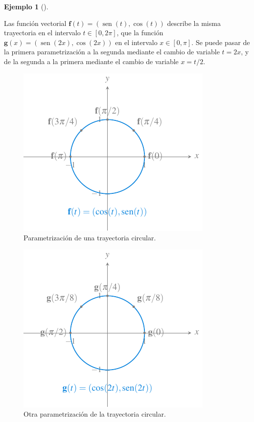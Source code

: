 \documentclass[
  a4paper,
]{scrreport}
\theoremstyle{definition}
\theoremstyle{plain}
\theoremstyle{plain}
\theoremstyle{definition}
\theoremstyle{definition}
\newtheorem{example}{Ejemplo}[chapter]
\theoremstyle{plain}
\theoremstyle{remark}
\begin{document}
\begin{example}[]\protect\hypertarget{exm-parametrizacion-trayectorias}{}\label{exm-parametrizacion-trayectorias}

Las función vectorial \(\mathbf{f}(t)=(\operatorname{sen}(t),\cos(t))\)
describe la misma trayectoria en el intervalo \(t\in[0,2\pi]\), que la
función \(\mathbf{g}(x) = (\operatorname{sen}(2x), \cos(2x))\) en el
intervalo \(x\in[0,\pi]\). Se puede pasar de la primera parametrización
a la segunda mediante el cambio de variable \(t=2x\), y de la segunda a
la primera mediante el cambio de variable \(x=t/2\).

\begin{figure}

{\centering \includegraphics{img/funciones-vectoriales/parametrizacion-trayectoria-circular.pdf}

}

\caption{Parametrización de una trayectoria circular.}

\end{figure}

\begin{figure}

{\centering \includegraphics{img/funciones-vectoriales/parametrizacion-trayectoria-circular-2.pdf}

}

\caption{Otra parametrización de la trayectoria circular.}

\end{figure}

\end{example}
\end{document}
